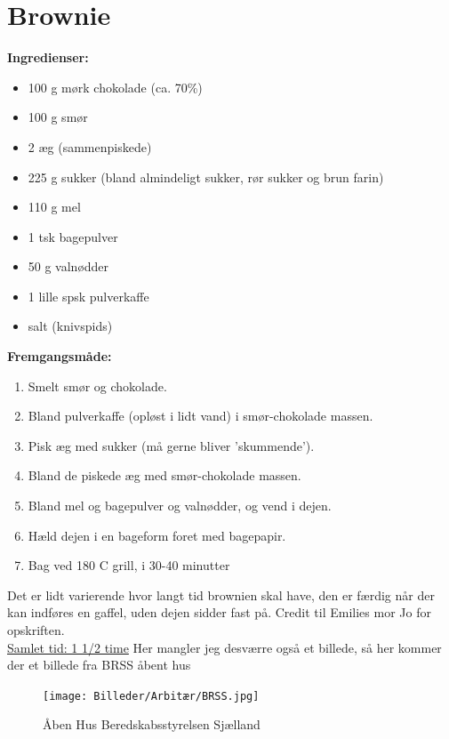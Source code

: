 \documentclass{book}
\begin{document}
\newpage \section{Brownie}
\begin{minipage}[t]{0.5\textwidth}
\textbf{Ingredienser:}
\begin{itemize}
  \item 100 g mørk chokolade (ca. 70\%)
  \item 100 g smør
  \item 2 æg (sammenpiskede)
  \item 225 g sukker (bland almindeligt sukker, rør sukker og brun farin)
  \item 110 g mel
  \item 1 tsk bagepulver
  \item 50 g valnødder
  \item 1 lille spsk pulverkaffe
  \item salt (knivspids)
\end{itemize}
\end{minipage}
\begin{minipage}[t]{0.5\textwidth}
\textbf{Fremgangsmåde:}
\begin{enumerate}
    \item Smelt smør og chokolade. 
    \item Bland pulverkaffe (opløst i lidt vand) i smør-chokolade massen.
    \item Pisk æg med sukker (må gerne bliver ’skummende’).
    \item Bland de piskede æg med smør-chokolade massen.
    \item Bland mel og bagepulver og valnødder, og vend i dejen.
    \item Hæld dejen i en bageform foret med bagepapir.
    \item Bag ved 180 \degree C grill, i 30-40 minutter
\end{enumerate}
\end{minipage}
Det er lidt varierende hvor langt tid brownien skal have, den er færdig når der kan indføres en gaffel, uden dejen sidder fast på. Credit til Emilies mor Jo for opskriften.
\\ \underline{Samlet tid: 1 1/2 time}
\newpage 
Her mangler jeg desværre også et billede, så her kommer der et billede fra BRSS åbent hus 
\begin{figure}
    \centering
    \texttt{[image: Billeder/Arbitær/BRSS.jpg]}
    \caption{Åben Hus Beredskabsstyrelsen Sjælland}
\end{figure}
\end{document}
